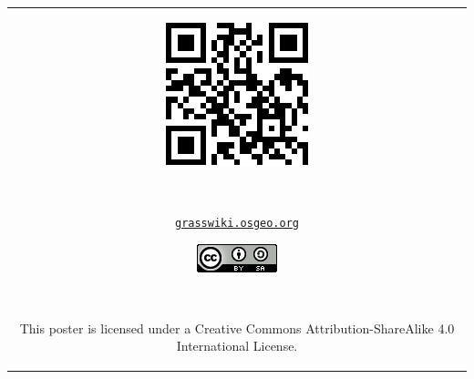 \documentclass[25pt, margin=0mm, innermargin=15mm, blockverticalspace=15mm, colspace=15mm, subcolspace=8mm]{tikzposter}
\begin{document}
\begin{columns}
{\begin{center}
\begin{tabular}{c}
\begin{minipage}{\qrcodesize}
\includegraphics[width=\textwidth]{./images/qr_grasswiki.pdf}
\end{minipage}
~
\begin{minipage}{0.2\linewidth}
\small {\href{http://grasswiki.osgeo.org}{\nolinkurl{grasswiki.osgeo.org}}}
\end{minipage}

\begin{minipage}{0.1\linewidth}
\href{http://creativecommons.org/licenses/by-sa/4.0/}{\includegraphics[width=\textwidth]{ccbysa}}
\end{minipage}
~
\begin{minipage}{0.35\linewidth}
\small This poster is licensed under a Creative Commons Attribution-ShareAlike 4.0 International License.
\end{minipage}

\end{tabular}
\end{center}

\vspace{-0.8cm}
}

\end{columns}
\end{document}
